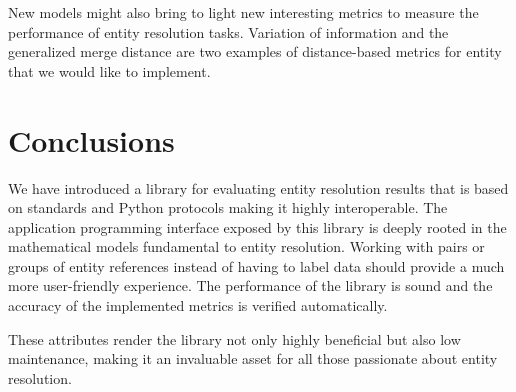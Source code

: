 \documentclass[11pt]{article}
\begin{document}
    New models might also bring to light new interesting metrics to
    measure the performance of entity resolution tasks.
    Variation of information\cite{meila2007vi} and the generalized merge
    distance\cite{Men10} are two examples of distance-based metrics for entity
    that we would like to implement.

    \section{Conclusions}\label{sec:conclusions}

    We have introduced a library for evaluating entity resolution results that
    is based on standards and Python protocols making it highly interoperable.
    The application programming interface exposed by this library is deeply
    rooted in the mathematical models fundamental to entity resolution.
    Working with pairs or groups of entity references instead of having to label
    data should provide a much more user-friendly experience.
    The performance of the library is sound and the accuracy of the implemented
    metrics is verified automatically.

    These attributes render the library not only highly beneficial but also low
    maintenance, making it an invaluable asset for all those passionate about
    entity resolution.

    
\end{document}

